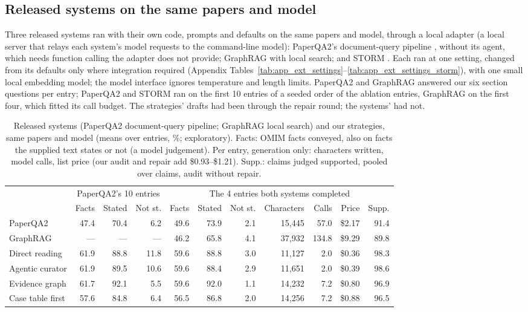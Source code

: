\documentclass{article} %
\begin{document}
\subsection{Released systems on the same papers and model}
\label{sec:released}
Three released systems ran with their own code, prompts and defaults on the same papers and model, through a local adapter (a local server that relays each system's model requests to the command-line model): PaperQA2's document-query pipeline \citep{skarlinski2024language}, without its agent, which needs function calling the adapter does not provide; GraphRAG \citep{edge2024local} with local search; and STORM \citep{shao2024assisting}. Each ran at one setting, changed from its defaults only where integration required (Appendix Tables~\ref{tab:app_ext_settings}--\ref{tab:app_ext_settings_storm}), with one small local embedding model; the model interface ignores temperature and length limits. PaperQA2 and GraphRAG answered our six section questions per entry; PaperQA2 and STORM ran on the first 10 entries of a seeded order of the ablation entries, GraphRAG on the first four, which fitted its call budget. The strategies' drafts had been through the repair round; the systems' had not.

\begin{table}[t]
\caption{Released systems (PaperQA2 document-query pipeline; GraphRAG local search) and our strategies, same papers and model (means over entries, \%; exploratory). Facts: OMIM facts conveyed, also on facts the supplied text states or not (a model judgement). Per entry, generation only: characters written, model calls, list price (our audit and repair add \$0.93--\$1.21). Supp.: claims judged supported, pooled over claims, audit without repair.}
\label{tab:released}
\begin{center}
\footnotesize
\setlength{\tabcolsep}{3.2pt}
\begin{tabular}{lrrrrrrrrrr}
\toprule
 & \multicolumn{3}{c}{PaperQA2's 10 entries} & \multicolumn{7}{c}{The 4 entries both systems completed} \\
\cmidrule(lr){2-4}\cmidrule(lr){5-11}
 & Facts & Stated & Not st. & Facts & Stated & Not st. & Characters & Calls & Price & Supp. \\
\midrule
PaperQA2 & 47.4 & 70.4 & 6.2 & 49.6 & 73.9 & 2.1 & 15,445 & 57.0 & \$2.17 & 91.4 \\
GraphRAG & --- & --- & --- & 46.2 & 65.8 & 4.1 & 37,932 & 134.8 & \$9.29 & 89.8 \\
Direct reading & 61.9 & 88.8 & 11.8 & 59.6 & 88.8 & 3.0 & 11,127 & 2.0 & \$0.36 & 98.3 \\
Agentic curator & 61.9 & 89.5 & 10.6 & 59.6 & 88.4 & 2.9 & 11,651 & 2.0 & \$0.39 & 98.6 \\
Evidence graph & 61.7 & 92.1 & 5.5 & 59.6 & 92.0 & 1.1 & 14,232 & 7.2 & \$0.80 & 96.9 \\
Case table first & 57.6 & 84.8 & 6.4 & 56.5 & 86.8 & 2.0 & 14,256 & 7.2 & \$0.88 & 96.5 \\
\bottomrule
\end{tabular}
\end{center}
\end{table}
\end{document}
